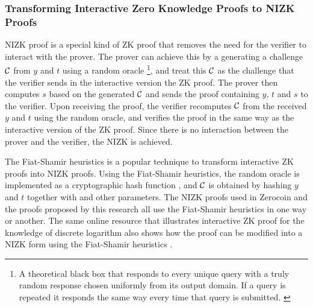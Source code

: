 \subsubsection{Transforming Interactive Zero Knowledge Proofs to NIZK Proofs}
\label{sec:3-Transforming Interactive Zero Knowledge Proofs to NIZK Proofs}
NIZK proof is a special kind of ZK proof that removes the need for the verifier to interact with the prover. The prover can achieve this by a generating a challenge $\mathcal{C}$ from $y$ and $t$ using a random oracle \footnote{A theoretical black box that responds to every unique query with a truly random response chosen uniformly from its output domain. If a query is repeated it responds the same way every time that query is submitted. \cite{Unknown2016a}}, and treat this $\mathcal{C}$ as the challenge that the verifier sends in the interactive version the ZK proof. The prover then computes $s$ based on the generated $\mathcal{C}$ and sends the proof containing $y$, $t$ and $s$ to the verifier. Upon receiving the proof, the verifier recomputes $\mathcal{C}$ from the received $y$ and $t$ using the random oracle, and verifies the proof in the same way as the interactive version of the ZK proof. Since there is no interaction between the prover and the verifier, the NIZK is achieved. 

The Fiat-Shamir heuristics \cite{Fiat1987} is a popular technique to transform interactive ZK proofs into NIZK proofs. Using the Fiat-Shamir heuristics, the random oracle is implemented as a cryptographic hash function \cite{Bellare1993}, and $\mathcal{C}$ is obtained by hashing $y$ and $t$ together with and other parameters. The NIZK proofs used in Zerocoin and the proofs proposed by this research all use the Fiat-Shamir heuristics in one way or another. The same online resource that illustrates interactive ZK proof for the knowledge of discrete logarithm also shows how the proof can be modified into a NIZK form using the Fiat-Shamir heuristics \cite{Unknown2016}. 

